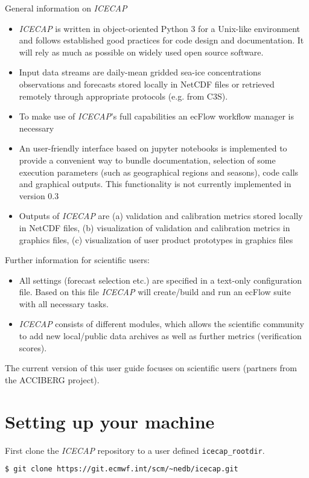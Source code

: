 \documentclass[DIV=10, parskip=full]{scrreprt}
\newcommand{\ice}{\textit{ICECAP}\xspace}
\newcommand{\version}{0.3\xspace}
\newcommand{\notimplement}[1]{#1}
\begin{document}
General information on \ice
\begin{itemize}
	\item \ice is written in object-oriented Python 3 for a Unix-like environment and follows established good practices for code design and documentation. It will rely as much as possible on widely used open source software.
	\item Input data streams are daily-mean gridded sea-ice concentrations observations and forecasts stored locally in NetCDF files or retrieved remotely through appropriate protocols (e.g. from C3S).
	\item \notimplement{To make use of \ice's full capabilities an ecFlow workflow manager is necessary}
	\item An user-friendly interface based on jupyter notebooks is implemented to provide a convenient way to bundle documentation, selection of some execution parameters (such as geographical regions and seasons), code calls and graphical outputs. \notimplement{This functionality is not currently implemented in version \version}
	\item Outputs of \ice are (a) validation and calibration metrics stored locally in NetCDF files, (b) visualization of validation and calibration metrics in graphics files, (c) visualization of user product prototypes in graphics files
\end{itemize}

Further information for scientific users:
\begin{itemize}
	\item All settings (forecast selection etc.) are specified in a text-only configuration file. Based on this file \ice will create/build and run an ecFlow suite  with all necessary tasks.
	\item \ice consists of different modules, which allows the scientific community to add new local/public data archives as well as further metrics (verification scores).
\end{itemize}

\notimplement{The current version of this user guide focuses on scientific users (partners from the ACCIBERG project)}. 


\FloatBarrier
\section{Setting up your machine}\label{sec:setup}
First clone the \ice repository to a user defined \texttt{icecap\_rootdir}.
\begin{lstlisting}[language=bash]
	$ git clone https://git.ecmwf.int/scm/~nedb/icecap.git
\end{lstlisting}
\end{document}
